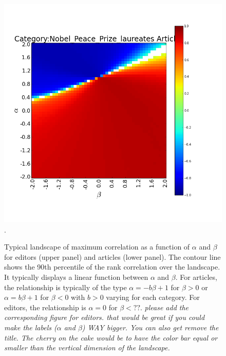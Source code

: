 \begin{figure}[!t]
\centering
\includegraphics[width=0.9\columnwidth]{Figures/landscape_nobel.png}.
\caption{Typical landscape of maximum correlation as a function of $\alpha$ and $\beta$ for editors (upper panel) and articles (lower panel). The contour line shows the 90th percentile of the rank correlation over the landscape. It typically displays a linear function between $\alpha$ and $\beta$. For articles, the relationship is typically of the type $\alpha = - b \beta + 1$ for $\beta >0$ or $\alpha = b \beta + 1$ for $\beta < 0$ with $b>0$ varying for each category. For editors, the relationship is $\alpha = 0$ for $\beta < ??$. {\it please add the corresponding figure for editors.  that would be great if you could make the labels ($\alpha$ and $\beta$) WAY bigger. You can also get remove the title. The cherry on the cake would be to have the color bar equal or smaller than the vertical dimension of the landscape.}}
\label{fig:landscape}
\end{figure}



%



